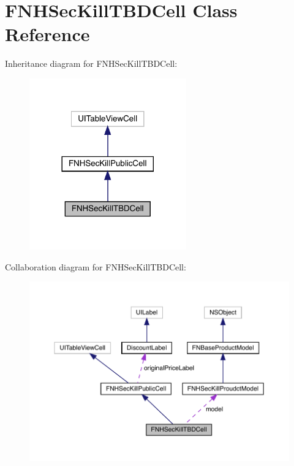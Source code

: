 \hypertarget{interface_f_n_h_sec_kill_t_b_d_cell}{}\section{F\+N\+H\+Sec\+Kill\+T\+B\+D\+Cell Class Reference}
\label{interface_f_n_h_sec_kill_t_b_d_cell}


Inheritance diagram for F\+N\+H\+Sec\+Kill\+T\+B\+D\+Cell\+:\nopagebreak
\begin{figure}[H]
\begin{center}
\leavevmode
\includegraphics[width=192pt]{interface_f_n_h_sec_kill_t_b_d_cell__inherit__graph}
\end{center}
\end{figure}


Collaboration diagram for F\+N\+H\+Sec\+Kill\+T\+B\+D\+Cell\+:\nopagebreak
\begin{figure}[H]
\begin{center}
\leavevmode
\includegraphics[width=350pt]{interface_f_n_h_sec_kill_t_b_d_cell__coll__graph}
\end{center}
\end{figure}
